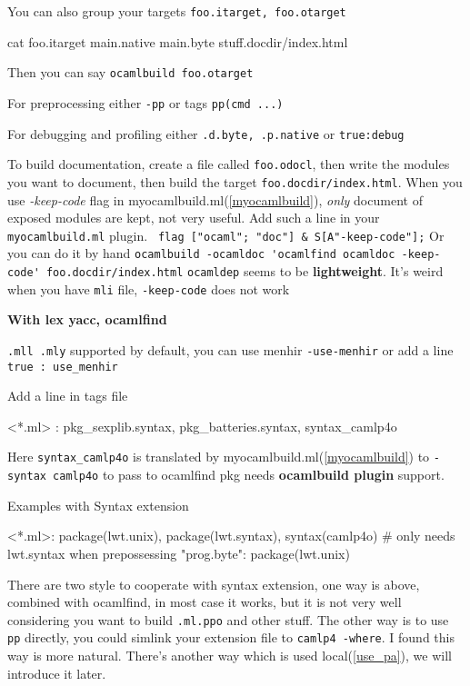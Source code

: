 You can also  group your targets \verb|foo.itarget, foo.otarget|
\begin{bluetext}
cat foo.itarget
main.native
main.byte 
stuff.docdir/index.html    
\end{bluetext}
Then you can say \verb|ocamlbuild foo.otarget|


For preprocessing either \verb|-pp| or tags \verb|pp(cmd ...)| 

For debugging and profiling either \verb|.d.byte, .p.native| or
\verb|true:debug|


To build documentation, create a file called \verb|foo.odocl|, then
write the modules you want to document, then build the target
\verb|foo.docdir/index.html|. When you use \textit{-keep-code} flag in
myocamlbuild.ml(\ref{myocamlbuild}), \textit{only} document of exposed
modules are kept, not very useful.  Add such a line in your
\verb|myocamlbuild.ml| plugin.
\verb| flag ["ocaml"; "doc"] & S[A"-keep-code"];| Or you can do it by
hand
\verb|ocamlbuild -ocamldoc 'ocamlfind ocamldoc -keep-code' foo.docdir/index.html|
\verb|ocamldep| seems to be \textbf{ lightweight}.  It's weird when
you have \verb|mli| file, \verb|-keep-code| does not work





\textbf{With lex yacc, ocamlfind }


\verb|.mll .mly| supported by default, you can use menhir
\verb|-use-menhir| or add a line \verb|true : use_menhir|

Add a line in tags file
\begin{bluetext}
<*.ml> : pkg_sexplib.syntax, pkg_batteries.syntax, syntax_camlp4o
\end{bluetext}

Here \verb|syntax_camlp4o| is translated by
myocamlbuild.ml(\ref{myocamlbuild}) to \verb|-syntax camlp4o| to pass
to ocamlfind pkg needs \textbf{ocamlbuild plugin} support.


Examples with Syntax extension 
\begin{bluetext}
<*.ml>: package(lwt.unix), package(lwt.syntax), syntax(camlp4o) # only needs lwt.syntax when prepossessing
"prog.byte": package(lwt.unix)
\end{bluetext}
There are two style to cooperate with syntax extension, one way is
above, combined with ocamlfind, in most case it works, but it is not
very well considering you want to build \verb|.ml.ppo| and other
stuff. The other way is to use \verb|pp| directly, you could simlink
your extension file to \verb|camlp4 -where|. I found this way is more
natural. There's another way which is used local(\ref{use_pa}), we
will introduce it later.


